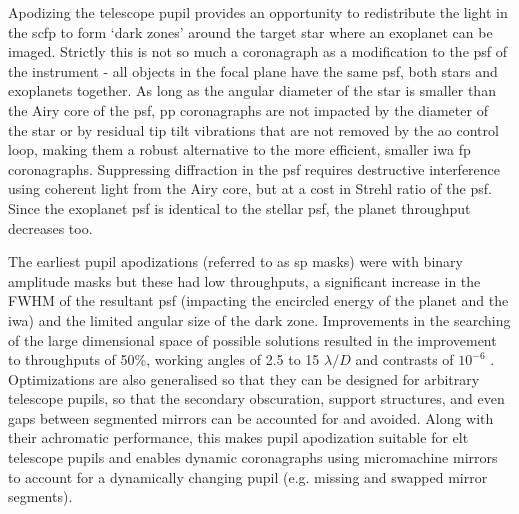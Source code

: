 \documentclass[letterpaper]{ar-1col}
\newcommand{\ld}{$\lambda/D$}
\newcommand{\acc}[1]{\entry{\acs{#1}}{\acl{#1}}}
\begin{document}
\begin{armarginnote}[]
\acc{sp}
\acc{app}
\acc{gvapp}
\acc{vvc}
\end{armarginnote}


Apodizing the telescope pupil provides an opportunity to redistribute the light in the \ac{scfp} to form `dark zones' around the target star where an exoplanet can be imaged.
%
Strictly this is not so much a coronagraph as a modification to the \ac{psf} of the instrument - all objects in the focal plane have the same \ac{psf}, both stars and exoplanets together.
%
As long as the angular diameter of the star is smaller than the Airy core of the \ac{psf}, \ac{pp} coronagraphs are not impacted by the diameter of the star or by residual tip tilt vibrations that are not removed by the \ac{ao} control loop, making them a robust alternative to the more efficient, smaller \ac{iwa} \ac{fp} coronagraphs. 
%
Suppressing diffraction in the \ac{psf} requires destructive interference using coherent light from the Airy core, but at a cost in Strehl ratio of the \ac{psf}.
%
Since the exoplanet \ac{psf} is identical to the stellar \ac{psf}, the planet throughput decreases too.

The earliest pupil apodizations (referred to as \ac{sp} masks) were with binary amplitude masks \citep{Jacquinot64,Kasdin05} but these had low throughputs, a significant increase in the FWHM of the resultant \ac{psf} (impacting the encircled energy of the planet and the \ac{iwa}) and the limited angular size of the dark zone.
% 
Improvements in the searching of the large dimensional space of possible solutions resulted in the improvement to throughputs of 50\%, working angles of 2.5 to 15 \ld{} and contrasts of $10^{-6}$ \citep{Carlotti11}.
%
Optimizations are also generalised so that they can be designed for arbitrary telescope pupils, so that the secondary obscuration, support structures, and even gaps between segmented mirrors can be accounted for and avoided.
%
Along with their achromatic performance, this makes pupil apodization  suitable for \ac{elt} telescope pupils and enables dynamic coronagraphs using micromachine mirrors \citep{Leboulleux22b,Carlotti23} to account for a dynamically changing pupil (e.g. missing and swapped mirror segments).
\end{document}
